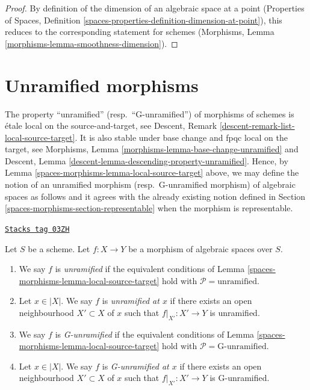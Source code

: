 \begin{proof}
By definition of the dimension of an algebraic space
at a point (Properties of Spaces, Definition
\ref{spaces-properties-definition-dimension-at-point}),
this reduces to the corresponding statement for schemes
(Morphisms, Lemma \ref{morphisms-lemma-smoothness-dimension}).
\end{proof}

\section{Unramified morphisms}
\label{spaces-morphisms-section-unramified}
The property ``unramified'' (resp.\ ``G-unramified'')
of morphisms of schemes is \'etale local on the source-and-target, see
Descent, Remark \ref{descent-remark-list-local-source-target}.
It is also stable under base change and fpqc local on the target, see
Morphisms, Lemma \ref{morphisms-lemma-base-change-unramified} and
Descent, Lemma \ref{descent-lemma-descending-property-unramified}.
Hence, by
Lemma \ref{spaces-morphisms-lemma-local-source-target}
above, we may define the notion of an unramified morphism
(resp.\ G-unramified morphism) of algebraic spaces
as follows and it agrees with the already existing notion defined in
Section \ref{spaces-morphisms-section-representable}
when the morphism is representable.

\begin{definition}[Unramified]
\label{spaces-morphisms-definition-unramified}
\href{https://stacks.math.columbia.edu/tag/03ZH}{\texttt{Stacks tag 03ZH}}

Let $S$ be a scheme.
Let $f : X \to Y$ be a morphism of algebraic spaces over $S$.
\begin{enumerate}
\item We say $f$ is {\it unramified} if the equivalent conditions of
Lemma \ref{spaces-morphisms-lemma-local-source-target}
hold with $\mathcal{P} = \text{unramified}$.
\item Let $x \in |X|$. We say $f$ is {\it unramified at $x$} if there
exists an open neighbourhood $X' \subset X$ of $x$ such that
$f|_{X'} : X' \to Y$ is unramified.
\item We say $f$ is {\it G-unramified} if the equivalent conditions of
Lemma \ref{spaces-morphisms-lemma-local-source-target}
hold with $\mathcal{P} = \text{G-unramified}$.
\item Let $x \in |X|$. We say $f$ is {\it G-unramified at $x$} if there
exists an open neighbourhood $X' \subset X$ of $x$ such that
$f|_{X'} : X' \to Y$ is G-unramified.
\end{enumerate}
\end{definition}

